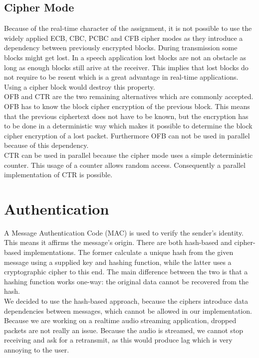 \documentclass[a4paper]{article}
\begin{document}
\subsection{Cipher Mode}
\label{par:cipher_mode}
Because of the real-time character of the assignment, it is not possible to use the widely applied ECB, CBC, PCBC and CFB cipher modes as they introduce a dependency between previously encrypted blocks. During transmission some blocks might get lost. In a speech application lost blocks are not an obstacle as long as enough blocks still arive at the receiver. This implies that lost blocks do not require to be resent which is a great advantage in real-time applications. Using a cipher block would destroy this property.\\

OFB and CTR are the two remaining alternatives which are commonly accepted. OFB has to know the block cipher encryption of the previous block. This means that the previous ciphertext does not have to be known, but the encryption has to be done in a deterministic way which makes it possible to determine the block cipher encryption of a lost packet. Furthermore OFB can not be used in parallel because of this dependency.\\

CTR can be used in parallel because the cipher mode uses a simple deterministic counter. This usage of a counter allows random access. Consequently a parallel implementation of CTR is possible.

\section{Authentication}

A Message Authentication Code (MAC) is used to verify the sender's identity. This means it affirms the message's origin. There are both hash-based and cipher-based implementations. The former calculate a unique hash from the given message using a supplied key and hashing function, while the latter uses a cryptographic cipher to this end. The main difference between the two is that a hashing function works one-way: the original data cannot be recovered from the hash.\\

We decided to use the hash-based approach, because the ciphers introduce data dependencies between messages, which cannot be allowed in our implementation. Because we are working on a realtime audio streaming application, dropped packets are not really an issue. Because the audio is streamed, we cannot stop receiving and ask for a retransmit, as this would produce lag which is very annoying to the user.\\
\end{document}
